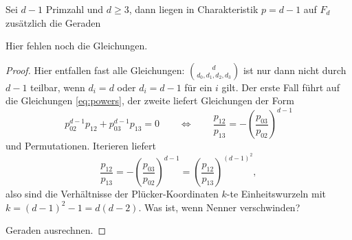 \begin{prop}
Sei $d-1$ Primzahl und $d \geq 3$, dann liegen in Charakteristik $p=d-1$ auf $F_d$ zusätzlich die Geraden

\todo Hier fehlen noch die Gleichungen.
\end{prop}
\begin{proof}
Hier entfallen fast alle Gleichungen: $\binom d{d_0,d_1,d_2,d_3}$ ist nur dann nicht durch $d-1$ teilbar, wenn $d_i=d$ oder $d_i=d-1$ für ein $i$ gilt. Der erste Fall führt auf die Gleichungen \ref{eq:powers}, der zweite liefert Gleichungen der Form
\begin{equation}
p_{02}^{d-1} p_{12} + p_{03}^{d-1} p_{13} = 0 \qquad\Leftrightarrow\qquad \frac{p_{12}}{p_{13}} = -\left(\frac{p_{03}}{p_{02}}\right)^{d-1}
\end{equation}
und Permutationen. Iterieren liefert
\begin{equation*}
\frac{p_{12}}{p_{13}} = -\left(\frac{p_{03}}{p_{02}}\right)^{d-1} = \left(\frac{p_{12}}{p_{13}}\right)^{(d-1)^2},
\end{equation*}
also sind die Verhältnisse der Plücker-Koordinaten $k$-te Einheitswurzeln mit $k=(d-1)^2-1=d(d-2)$. \note Was ist, wenn Nenner verschwinden?

\todo Geraden ausrechnen.
\end{proof}
